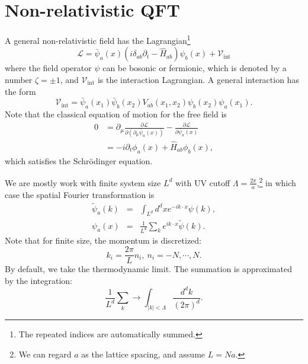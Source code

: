 \chapter{Non-relativistic QFT}
A general non-relativistic field has the Lagrangian\footnote{The repeated indices are automatically summed.}
\begin{equation}
	\mathcal L = \bar\psi_a(x) (i\delta_{ab}\partial_t-\hat H_{ab})\psi_b(x) + \mathcal{V}_{\mathrm{int}}
\end{equation}
where the field operator $\psi$ can be bosonic or fermionic, which is denoted by a number $\zeta=\pm 1$, and $\mathcal{V}_{\mathrm{int}}$ is the interaction Lagrangian.
A general interaction has the form
\begin{equation}
	\mathcal{V}_{\mathrm{int}} = \bar\psi_{a}(x_1)\bar\psi_{b}(x_2) V_{ab}(x_1,x_2) \psi_{b}(x_2)\psi_{a}(x_1).
\end{equation}
Note that the classical equation of motion for the free field is
\begin{equation}
\begin{aligned}
	0 &= \partial_\mu \frac{\partial \mathcal L}{\partial(\partial_\mu \bar\psi_a(x))} - \frac{\partial \mathcal L}{\partial\bar{\psi}_a(x)} \\
	&= - i\partial_t \phi_a(x) + \hat H_{ab}\phi_b(x),
\end{aligned}
\end{equation}
which satisfies the Schr\"{o}dinger equation.

We are mostly work with finite system size $L^d$ with UV cutoff $\Lambda = \frac{2\pi}{a}$,\footnote{We can regard $a$ as the lattice spacing, and assume $L = Na$.} in which case the spatial Fourier transformation is
\begin{eqnarray}
	\tilde{\psi}_a(k) &=& \int_{L^d} d^dx e^{-i k \cdot x}\psi(k), \\
	\psi_a(x) &=& \frac{1}{L^d}\sum_{k} e^{i k \cdot x}\tilde{\psi}(k).
\end{eqnarray}
Note that for finite size, the momentum is discretized: 
\begin{equation}
	k_i = \frac{2\pi}{L} n_i,\ n_i = -N,\cdots,N.
\end{equation}
By default, we take the thermodynamic limit.
The summation is approximated by the integration:
\begin{equation}
	\frac{1}{L^d}\sum_k \longrightarrow \int_{|k|<\Lambda} \frac{d^dk}{(2\pi)^d}.
\end{equation}

